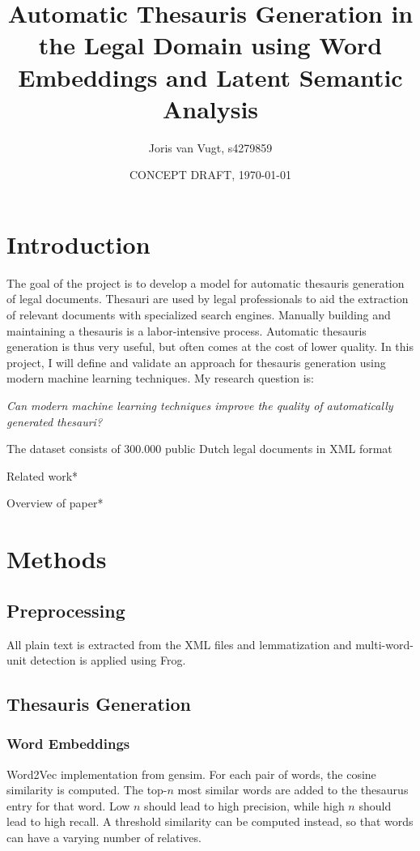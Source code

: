 \documentclass{article}
\author{Joris van Vugt, s4279859}
\date{CONCEPT DRAFT, \today}
\title{Automatic Thesauris Generation in the Legal Domain using Word Embeddings and Latent Semantic Analysis}
\begin{document}
\maketitle
\begin{multicols}{2}
\section{Introduction}
\par The goal of the project is to develop a model for automatic thesauris generation of legal documents. Thesauri are used by legal professionals to aid the extraction of relevant documents with specialized search engines. Manually building and maintaining a thesauris is a labor-intensive process. Automatic thesauris generation is thus very useful, but often comes at the cost of lower quality. In this project, I will define and validate an approach for thesauris generation using modern machine learning techniques. My research question is:

\par \emph{Can modern machine learning techniques improve the quality of automatically generated thesauri?}

\par The dataset consists of 300.000 public Dutch legal documents in  XML format

\par *Related work*

\par *Overview of paper*


\section{Methods}
\subsection{Preprocessing}
All plain text is extracted from the XML files and lemmatization and multi-word-unit detection is applied using Frog\cite{bosch2007efficient}.
\subsection{Thesauris Generation}
\subsubsection{Word Embeddings}
Word2Vec\cite{mikolov2013distributed} implementation from gensim\cite{rehurek_lrec}. For each pair of words, the cosine similarity is computed. The top-$n$ most similar words are added to the thesaurus entry for that word. Low $n$ should lead to high precision, while high $n$ should lead to high recall. A threshold similarity can be computed instead, so that words can have a varying number of relatives.

\end{multicols}
\end{document}
